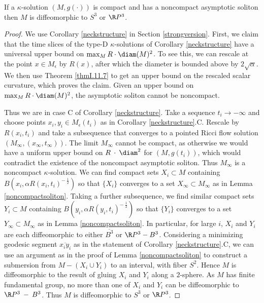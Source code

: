 \begin{lemma}
  \label{lem:kl-three-dimensional-solutions-compactness-kappa-solutions}
 \label{S3RP3}
If a $\kappa$-solution $(M, g(\cdot))$
is compact and has a noncompact asymptotic soliton
then $M$ is diffeomorphic to $S^3$ or $\R P^3$.
\end{lemma}
\begin{proof}
We use Corollary \ref{neckstructure} in Section \ref{strongversion}.
First, we claim that the time slices of the type-D $\kappa$-solutions of
Corollary \ref{neckstructure} have a
universal upper bound on $\max_M R \cdot \diam(M)^2$.
To see this, we can rescale at the point $x \in M_\epsilon$ by
$R(x)$, after which the diameter is bounded above by
$2 \sqrt{\alpha}$. We then use Theorem \ref{thmI.11.7}
to get an upper bound on the rescaled
scalar curvature, which proves the claim. Given an upper bound on
$\max_M R \cdot \diam(M)^2$, the asymptotic soliton
cannot be noncompact.

Thus we are in case C of Corollary \ref{neckstructure}.
Take a sequence $t_i \rightarrow - \infty$ and choose points $x_i, y_i
\in M_\epsilon(t_i)$ as in Corollary \ref{neckstructure}.C.
Rescale by
$R(x_i, t_i)$ and take a subsequence that converges to a pointed
Ricci flow solution
$(M_\infty, (x_\infty, t_\infty))$. The limit $M_\infty$ cannot be
compact, as otherwise we would have a uniform upper bound on
$R \: \cdot \: \diam^2$ for $(M, g(t_i))$, which would
contradict the existence of the noncompact asymptotic soliton.
Thus $M_\infty$ is a noncompact $\kappa$-solution.
We can find compact sets $X_i \subset M$
containing $B(x_i, \alpha R(x_i, t_i)^{- \: \frac12})$ so that
$\{X_i\}$ converges to a set $X_\infty \subset M_\infty$ as in
Lemma \ref{noncompactsoliton}.
Taking a further subsequence, we find similar compact
sets $Y_i \subset M$ containing
$B(y_i, \alpha R(y_i, t_i)^{- \: \frac12})$ so that $\{Y_i\}$ converges to
a set $Y_\infty \subset M_\infty$ as in Lemma
\ref{noncompactsoliton}. In particular, for large $i$, $X_i$ and $Y_i$ are
each diffeomorphic to either $\overline{B^3}$ or $\R P^3 - B^3$.
Considering a minimizing geodesic
segment $\overline{x_i y_i}$ as in the statement of
Corollary \ref{neckstructure}.C, we
can use an argument as in the proof of Lemma
\ref{noncompactsoliton} to construct a submersion from
$M - (X_i \cup Y_i)$ to an interval, with fiber $S^2$. Hence $M$
is diffeomorphic to the result of gluing $X_i$ and $Y_i$ along
a $2$-sphere.
As $M$ has finite fundamental group, no more
than one of $X_i$ and $Y_i$ can be diffeomorphic to
$\R P^3 \: - \: {B^3}$. Thus $M$ is diffeomorphic to
$S^3$ or $\R P^3$.
\end{proof}

